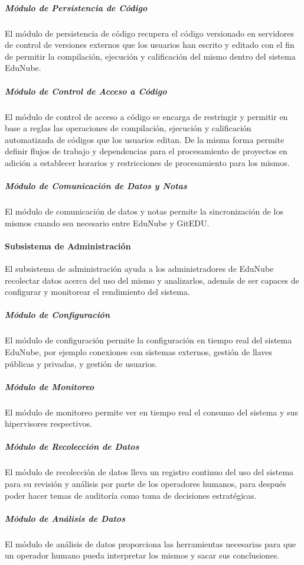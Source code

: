 \subparagraph{Módulo de Persistencia de Código}
El módulo de persistencia de código recupera el código versionado en servidores de control de versiones externos que los usuarios han escrito y editado con el fin de permitir la compilación, ejecución y calificación del mismo dentro del sistema EduNube.

\subparagraph{Módulo de Control de Acceso a Código}
El módulo de control de acceso a código se encarga de restringir y permitir en base a reglas las operaciones de compilación, ejecución y calificación automatizada de códigos que los usuarios editan. De la misma forma permite definir flujos de trabajo y dependencias para el procesamiento de proyectos en adición a establecer horarios y restricciones de procesamiento para los mismos.

\subparagraph{Módulo de Comunicación de Datos y Notas}
El módulo de comunicación de datos y notas permite la sincronización de los mismos cuando sea necesario entre EduNube y GitEDU.

\paragraph{Subsistema de Administración}
El subsistema de administración ayuda a los administradores de EduNube recolectar datos acerca del uso del mismo y analizarlos, además de ser capaces de configurar y monitorear el rendimiento del sistema.

\subparagraph{Módulo de Configuración}
El módulo de configuración permite la configuración en tiempo real del sistema EduNube, por ejemplo conexiones con sistemas externos, gestión de llaves públicas y privadas, y gestión de usuarios.

\subparagraph{Módulo de Monitoreo}
El módulo de monitoreo permite ver en tiempo real el consumo del sistema y sus hipervisores respectivos.

\subparagraph{Módulo de Recolección de Datos}
El módulo de recolección de datos lleva un registro continuo del uso del sistema para su revisión y análisis por parte de los operadores humanos, para después poder hacer temas de auditoría como toma de decisiones estratégicas.

\subparagraph{Módulo de Análisis de Datos}
El módulo de análisis de datos proporciona las herramientas necesarias para que un operador humano pueda interpretar los mismos y sacar sus conclusiones.

